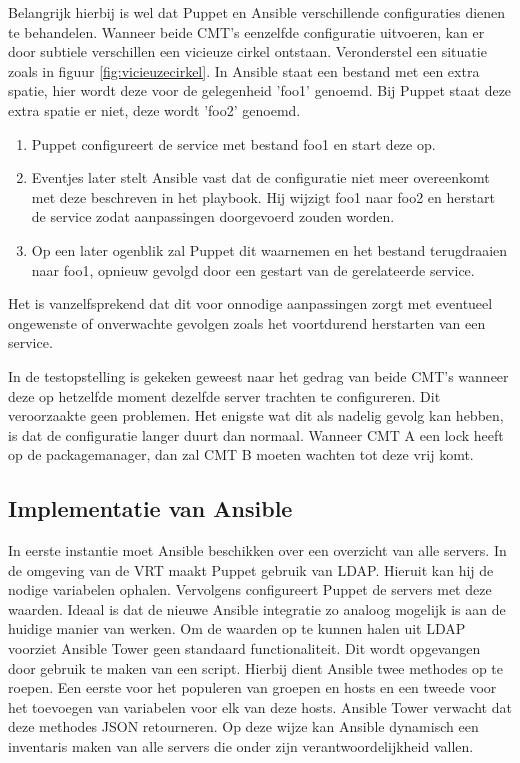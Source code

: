  Belangrijk hierbij is wel dat Puppet en Ansible verschillende configuraties dienen te behandelen. Wanneer beide \gls{CMT}'s eenzelfde configuratie uitvoeren, kan er door subtiele verschillen een vicieuze cirkel ontstaan.
Veronderstel een situatie zoals in figuur \ref{fig:vicieuzecirkel}. In Ansible staat een bestand met een extra spatie, hier wordt deze voor de gelegenheid 'foo1' genoemd. Bij Puppet staat deze extra spatie er niet, deze wordt 'foo2' genoemd. 
\begin{enumerate}
\item Puppet configureert de service met bestand foo1 en start deze op.
\item  Eventjes later stelt Ansible vast dat de configuratie niet meer overeenkomt met deze beschreven in het playbook. Hij wijzigt foo1 naar foo2 en herstart de service zodat aanpassingen doorgevoerd zouden worden.
\item  Op een later ogenblik zal Puppet dit waarnemen en het bestand terugdraaien naar foo1, opnieuw gevolgd door een gestart van de gerelateerde service.
\end{enumerate}
Het is vanzelfsprekend dat dit voor onnodige aanpassingen zorgt met eventueel ongewenste of onverwachte gevolgen zoals het voortdurend herstarten van een service.

In de testopstelling is gekeken geweest naar het gedrag van beide \gls{CMT}'s wanneer deze op hetzelfde moment dezelfde server trachten te configureren. Dit veroorzaakte geen problemen.
Het enigste wat dit als nadelig gevolg kan hebben, is dat de configuratie langer duurt dan normaal. Wanneer \gls{CMT} A een lock heeft op de \gls{packagemanager}, dan zal \gls{CMT} B moeten wachten tot deze vrij komt. 

\subsection{Implementatie van Ansible}
In eerste instantie moet Ansible beschikken over een overzicht van alle servers. In de omgeving van de \gls{VRT} maakt Puppet gebruik van \gls{LDAP}. Hieruit kan hij de nodige variabelen ophalen. Vervolgens configureert Puppet de servers met deze waarden. Ideaal is dat de nieuwe Ansible integratie zo analoog mogelijk is aan de huidige manier van werken. Om de waarden op te kunnen halen uit \gls{LDAP} voorziet Ansible Tower geen standaard functionaliteit. Dit wordt opgevangen door gebruik te maken van een script. Hierbij dient Ansible twee methodes op te roepen. Een eerste voor het populeren van groepen en hosts en een tweede voor het toevoegen van variabelen voor elk van deze hosts. Ansible Tower verwacht dat deze methodes JSON retourneren. Op deze wijze kan Ansible dynamisch een inventaris maken van alle servers die onder zijn verantwoordelijkheid vallen.

